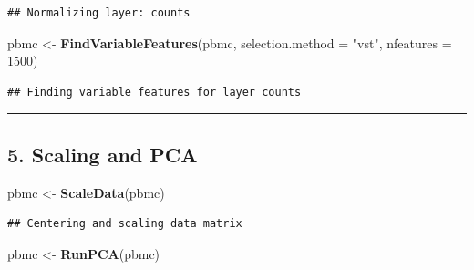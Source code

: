 \documentclass[
]{article}
\newenvironment{Shaded}{\begin{snugshade}}{\end{snugshade}}
\newcommand{\AttributeTok}[1]{\textcolor[rgb]{0.13,0.29,0.53}{#1}}
\newcommand{\DecValTok}[1]{\textcolor[rgb]{0.00,0.00,0.81}{#1}}
\newcommand{\FunctionTok}[1]{\textcolor[rgb]{0.13,0.29,0.53}{\textbf{#1}}}
\newcommand{\NormalTok}[1]{#1}
\newcommand{\OtherTok}[1]{\textcolor[rgb]{0.56,0.35,0.01}{#1}}
\newcommand{\StringTok}[1]{\textcolor[rgb]{0.31,0.60,0.02}{#1}}
\begin{document}
\begin{verbatim}
## Normalizing layer: counts
\end{verbatim}

\begin{Shaded}
\begin{Highlighting}[]
\NormalTok{pbmc }\OtherTok{\textless{}{-}} \FunctionTok{FindVariableFeatures}\NormalTok{(pbmc, }\AttributeTok{selection.method =} \StringTok{"vst"}\NormalTok{, }\AttributeTok{nfeatures =} \DecValTok{1500}\NormalTok{)}
\end{Highlighting}
\end{Shaded}

\begin{verbatim}
## Finding variable features for layer counts
\end{verbatim}

\begin{center}\rule{0.5\linewidth}{0.5pt}\end{center}

\subsection{5. Scaling and PCA}\label{scaling-and-pca}

\begin{Shaded}
\begin{Highlighting}[]
\NormalTok{pbmc }\OtherTok{\textless{}{-}} \FunctionTok{ScaleData}\NormalTok{(pbmc)}
\end{Highlighting}
\end{Shaded}

\begin{verbatim}
## Centering and scaling data matrix
\end{verbatim}

\begin{Shaded}
\begin{Highlighting}[]
\NormalTok{pbmc }\OtherTok{\textless{}{-}} \FunctionTok{RunPCA}\NormalTok{(pbmc)}
\end{Highlighting}
\end{Shaded}
\end{document}
